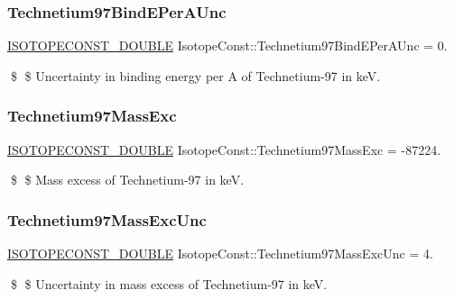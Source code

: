 \subsubsection{\texorpdfstring{Technetium97\+Bind\+E\+Per\+A\+Unc}{Technetium97BindEPerAUnc}}
{\footnotesize\ttfamily \mbox{\hyperlink{group___isotope_const-_macros_ga8f45a7272ce02c0b4c65c44636ed719a}{I\+S\+O\+T\+O\+P\+E\+C\+O\+N\+S\+T\+\_\+\+D\+O\+U\+B\+LE}} Isotope\+Const\+::\+Technetium97\+Bind\+E\+Per\+A\+Unc = 0.}

\$ \$ Uncertainty in binding energy per A of Technetium-\/97 in keV. \mbox{\label{group___isotope_const-_technetium-_tc97_gaba0744e2fabc1da2c0bfcb5dbd028b2e}} 
\subsubsection{\texorpdfstring{Technetium97\+Mass\+Exc}{Technetium97MassExc}}
{\footnotesize\ttfamily \mbox{\hyperlink{group___isotope_const-_macros_ga8f45a7272ce02c0b4c65c44636ed719a}{I\+S\+O\+T\+O\+P\+E\+C\+O\+N\+S\+T\+\_\+\+D\+O\+U\+B\+LE}} Isotope\+Const\+::\+Technetium97\+Mass\+Exc = -\/87224.}

\$ \$ Mass excess of Technetium-\/97 in keV. \mbox{\label{group___isotope_const-_technetium-_tc97_ga6cabd3eb8877c5db6ccf546fa1824802}} 
\subsubsection{\texorpdfstring{Technetium97\+Mass\+Exc\+Unc}{Technetium97MassExcUnc}}
{\footnotesize\ttfamily \mbox{\hyperlink{group___isotope_const-_macros_ga8f45a7272ce02c0b4c65c44636ed719a}{I\+S\+O\+T\+O\+P\+E\+C\+O\+N\+S\+T\+\_\+\+D\+O\+U\+B\+LE}} Isotope\+Const\+::\+Technetium97\+Mass\+Exc\+Unc = 4.}

\$ \$ Uncertainty in mass excess of Technetium-\/97 in keV. \mbox{\label{group___isotope_const-_technetium-_tc97_ga7baa8a1b3b1dd5754f8d38275ee02fdf}} 
